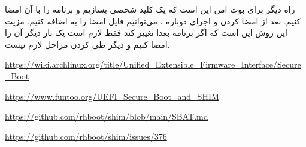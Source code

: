 
راه دیگر برای بوت امن این است که یک کلید شخصی بسازیم و برنامه  را با آن امضا کنیم. بعد از
امضا کردن و اجرای دوباره ، می‌توانیم فایل  امضا را به  اضافه کنیم. مزیت
این روش این است که اگر برنامه بعدا تغییر کند فقط لازم است یک بار دیگر آن را امضا کنیم و دیگر طی کردن
مراحل  لازم نیست.



\begin{latin}
\url{https://wiki.archlinux.org/title/Unified_Extensible_Firmware_Interface/Secure_Boot}

\url{https://www.funtoo.org/UEFI_Secure_Boot_and_SHIM}

\url{https://github.com/rhboot/shim/blob/main/SBAT.md}

\url{https://github.com/rhboot/shim/issues/376}
\end{latin}
